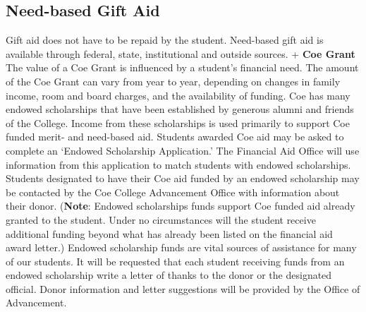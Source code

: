 \documentclass[
  letterpaper,
]{scrbook}
\begin{document}
\subsection{Need-based Gift Aid}\label{need-based-gift-aid}

Gift aid does not have to be repaid by the student. Need-based gift aid
is available through federal, state, institutional and outside sources.
+ \textbf{Coe Grant} The value of a Coe Grant is influenced by a
student's financial need. The amount of the Coe Grant can vary from year
to year, depending on changes in family income, room and board charges,
and the availability of funding. Coe has many endowed scholarships that
have been established by generous alumni and friends of the College.
Income from these scholarships is used primarily to support Coe funded
merit- and need-based aid. Students awarded Coe aid may be asked to
complete an `Endowed Scholarship Application.' The Financial Aid Office
will use information from this application to match students with
endowed scholarships. Students designated to have their Coe aid funded
by an endowed scholarship may be contacted by the Coe College
Advancement Office with information about their donor. (\textbf{Note}:
Endowed scholarships funds support Coe funded aid already granted to the
student. Under no circumstances will the student receive additional
funding beyond what has already been listed on the financial aid award
letter.) Endowed scholarship funds are vital sources of assistance for
many of our students. It will be requested that each student receiving
funds from an endowed scholarship write a letter of thanks to the donor
or the designated official. Donor information and letter suggestions
will be provided by the Office of Advancement.
\end{document}
